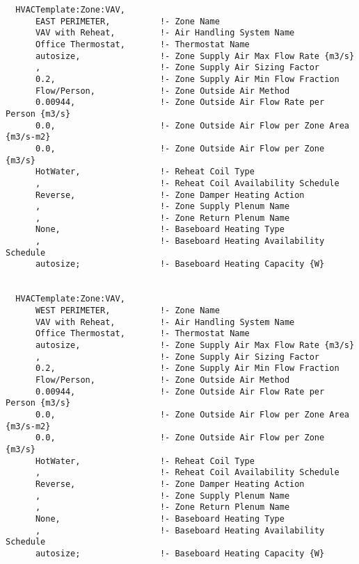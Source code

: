 \begin{lstlisting}
  HVACTemplate:Zone:VAV,
      EAST PERIMETER,          !- Zone Name
      VAV with Reheat,         !- Air Handling System Name
      Office Thermostat,       !- Thermostat Name
      autosize,                !- Zone Supply Air Max Flow Rate {m3/s}
      ,                        !- Zone Supply Air Sizing Factor
      0.2,                     !- Zone Supply Air Min Flow Fraction
      Flow/Person,             !- Zone Outside Air Method
      0.00944,                 !- Zone Outside Air Flow Rate per Person {m3/s}
      0.0,                     !- Zone Outside Air Flow per Zone Area {m3/s-m2}
      0.0,                     !- Zone Outside Air Flow per Zone {m3/s}
      HotWater,                !- Reheat Coil Type
      ,                        !- Reheat Coil Availability Schedule
      Reverse,                 !- Zone Damper Heating Action
      ,                        !- Zone Supply Plenum Name
      ,                        !- Zone Return Plenum Name
      None,                    !- Baseboard Heating Type
      ,                        !- Baseboard Heating Availability Schedule
      autosize;                !- Baseboard Heating Capacity {W}


  HVACTemplate:Zone:VAV,
      WEST PERIMETER,          !- Zone Name
      VAV with Reheat,         !- Air Handling System Name
      Office Thermostat,       !- Thermostat Name
      autosize,                !- Zone Supply Air Max Flow Rate {m3/s}
      ,                        !- Zone Supply Air Sizing Factor
      0.2,                     !- Zone Supply Air Min Flow Fraction
      Flow/Person,             !- Zone Outside Air Method
      0.00944,                 !- Zone Outside Air Flow Rate per Person {m3/s}
      0.0,                     !- Zone Outside Air Flow per Zone Area {m3/s-m2}
      0.0,                     !- Zone Outside Air Flow per Zone {m3/s}
      HotWater,                !- Reheat Coil Type
      ,                        !- Reheat Coil Availability Schedule
      Reverse,                 !- Zone Damper Heating Action
      ,                        !- Zone Supply Plenum Name
      ,                        !- Zone Return Plenum Name
      None,                    !- Baseboard Heating Type
      ,                        !- Baseboard Heating Availability Schedule
      autosize;                !- Baseboard Heating Capacity {W}



\end{lstlisting}
